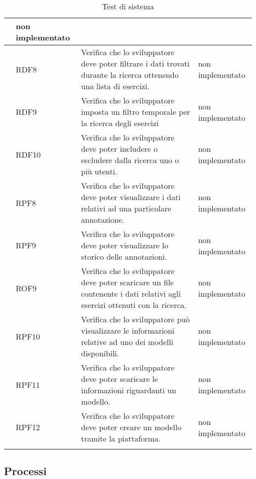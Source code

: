 \begin{longtable}{|p{2cm}|p{2cm}|p{6.25cm}|p{4cm}|}
		& non implementato\\ \hline
		\rowcolor{LightGray}
		& RDF8 
		& Verifica che lo sviluppatore deve poter filtrare i dati trovati durante la ricerca ottenendo una lista di esercizi. 
		& non implementato\\ \hline
		\rowcolor{LightGray}
		& RDF9 
		& Verifica che lo sviluppatore imposta un filtro temporale per la ricerca degli esercizi 
		& non implementato\\ \hline
		\rowcolor{LightGray}
		& RDF10 
		& Verifica che lo sviluppatore deve poter includere o escludere dalla ricerca uno o più utenti. 
		& non implementato\\ \hline 
		\rowcolor{LightGray}
		& RPF8 
		& Verifica che lo sviluppatore deve poter visualizzare i dati relativi ad una particolare annotazione. 		
		& non implementato\\ \hline
		\rowcolor{LightGray}\rowcolor{LightGray}
		& RPF9 
		& Verifica che lo sviluppatore deve poter visualizzare lo storico delle annotazioni. 
		&  non implementato\\ \hline
		\rowcolor{LightGray}
		& ROF9 
		& Verifica che lo sviluppatore deve poter scaricare un file contenente i dati relativi agli esercizi ottenuti con la ricerca.
		& non implementato\\ \hline
		\rowcolor{LightGray}
		& RPF10 
		& Verifica che lo sviluppatore può visualizzare le informazioni relative ad uno dei modelli disponibili. 
		& non implementato\\ \hline
		\rowcolor{LightGray}
		& RPF11 
		& Verifica che lo sviluppatore deve poter scaricare le informazioni riguardanti un modello. 
		& non implementato\\\hline\hline
		\rowcolor{LightGray}
		& RPF12 
		& Verifica che lo sviluppatore deve poter creare un modello tramite la piattaforma. 
		& non implementato\\ \hline	
		
		\caption{Test di sistema}
\end{longtable}
\subsection{Processi}
